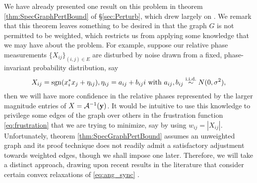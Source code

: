 We have already presented one result on this problem in theorem \ref{thm:SpecGraphPertBound} of \S\ref{sec:Perturb}, which drew largely on \cite{alexeev2014phase}.  %
We remark that this theorem leaves something to be desired in that the graph $G$ is not permitted to be weighted, which restricts us from applying some knowledge that we may have about the problem.  For example, suppose our relative phase measurements $\{X_{ij}\}_{(i,j) \in E}$ are disturbed by noise drawn from a fixed, phase-invariant probability distribution, say \[X_{ij} = \operatorname{sgn}(x_i^*x_j + \eta_{ij}), \eta_{ij} = a_{ij} + b_{ij}i \ \text{with} \ a_{ij}, b_{ij} \overset{\text{i.i.d.}}{\sim} N(0, \sigma^2),\] then we will have more confidence in the relative phases represented by the larger magnitude entries of $X = \mathcal{A}^{-1}(\mathbf{y})$.  It would be intuitive to use this knowledge to privilege some edges of the graph over others in the frustration function \eqref{eq:frustration} that we are trying to minimize, say by using $w_{ij} = |X_{ij}|$.  Unfortunately, theorem \ref{thm:SpecGraphPertBound} assumes an unweighted graph and its proof technique does not readily admit a satisfactory adjustment towards weighted edges, though we shall impose one later.  Therefore, we will take a distinct approach, drawing upon recent results in the literature that consider certain convex relaxations of \eqref{eq:ang_sync} \cite{bandeira2016tightness, calafiore2016complex_pgo, bandeira2016se_sync}.


